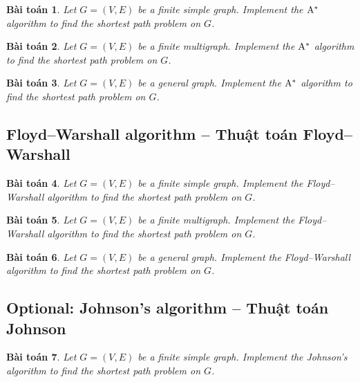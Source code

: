 \documentclass{article}
\newtheorem{baitoan}{Bài toán}
\begin{document}
\begin{baitoan}
    Let $G = (V,E)$ be a finite simple graph. Implement the $\rm A^*$ algorithm to find the shortest path problem on $G$.
\end{baitoan}

\begin{baitoan}
    Let $G = (V,E)$ be a finite multigraph. Implement the $\rm A^*$ algorithm to find the shortest path problem on $G$.
\end{baitoan}

\begin{baitoan}
    Let $G = (V,E)$ be a general graph. Implement the $\rm A^*$ algorithm to find the shortest path problem on $G$.
\end{baitoan}


\subsection{Floyd--Warshall algorithm -- Thuật toán Floyd--Warshall}

\begin{baitoan}
    Let $G = (V,E)$ be a finite simple graph. Implement the Floyd--Warshall algorithm to find the shortest path problem on $G$.
\end{baitoan}

\begin{baitoan}
    Let $G = (V,E)$ be a finite multigraph. Implement the Floyd--Warshall algorithm to find the shortest path problem on $G$.
\end{baitoan}

\begin{baitoan}
    Let $G = (V,E)$ be a general graph. Implement the Floyd--Warshall algorithm to find the shortest path problem on $G$.
\end{baitoan}


\subsection{Optional: Johnson's algorithm -- Thuật toán Johnson}

\begin{baitoan}
    Let $G = (V,E)$ be a finite simple graph. Implement the Johnson's algorithm to find the shortest path problem on $G$.
\end{baitoan}
\end{document}
